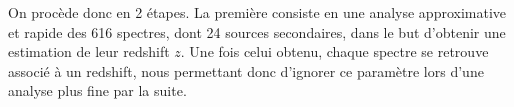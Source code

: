 \documentclass[11pt, a4paper]{article}
\begin{document}
On procède donc en 2 étapes. La première consiste en une analyse approximative et rapide des 616 spectres, dont 24 sources secondaires, dans le but d'obtenir une estimation de leur redshift $z$. Une fois celui obtenu, chaque spectre se retrouve associé à un redshift, nous permettant donc d'ignorer ce paramètre lors d'une analyse plus fine par la suite.


\newpage

\printnoidxglossaries

\newpage

\printbibliography %
\end{document}
